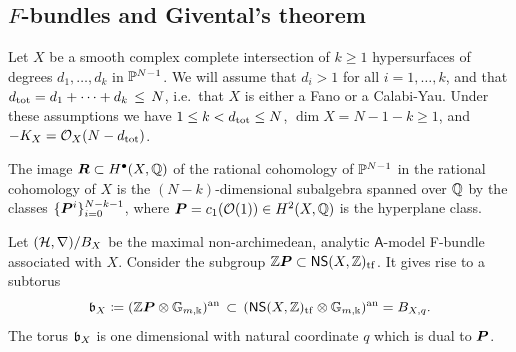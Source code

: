\documentclass[twoside,leqno]{article}
\numberwithin{equation}{section}
\theoremstyle{plain}
\theoremstyle{definition}
\begin{document}
\subsection{\texorpdfstring{$F$}{F}-bundles and Givental's theorem} \label{ssec:givental}
 
Let $X$ be a smooth complex complete intersection of $k \geq 1$ hypersurfaces of degrees $d_{1}, \ldots, d_{k}$ in $\mathbb P^{N-1}$. We will assume that $d_{i} > 1$ for all $i =1, \ldots, k$, and that $d_{\operatorname{tot}} = d_{1} + \cdots + d_{k} \, \leq \, N$, i.e.\ that $X$ is either a Fano or a Calabi-Yau. Under these assumptions we have $1 \leq k < d_{\operatorname{tot}} \leq N$, 
$\dim X = N - 1 - k \geq 1$, and $-K_{X} = \mathcal O_{X}(N - d_{\operatorname{tot}})$. 

The image $\boldsymbol{R} \subset H^{\bullet}(X,\mathbb Q)$ of the rational cohomology of $\mathbb P^{N-1}$ in the rational cohomology of $X$ is the $(N-k)$-dimensional subalgebra spanned over $\mathbb Q$ by the classes $\{\boldsymbol{P}^{i} \}_{i = 0}^{N-k-1}$, where $\boldsymbol{P} = c_{1}(\mathcal O(1)) \in H^2(X,\mathbb Q)$ is the hyperplane class. 


Let $(\mathcal H,\nabla)/B_{X}$ be the maximal non-archimedean, analytic $\mathsf{A}$-model F-bundle associated with  $X$. Consider the subgroup $\mathbb Z\boldsymbol{P} \subset \mathsf{NS}(X,\mathbb Z)_{\operatorname{tf}}$. It gives rise to a subtorus 
\[
\mathfrak{b}_{X} \coloneqq (\mathbb Z\boldsymbol{P} \otimes \mathbb G_{m,\Bbbk})^{\operatorname{an}} \, \subset \, (\mathsf{NS}(X,\mathbb Z)_{\operatorname{tf}}\otimes \mathbb G_{m,\Bbbk})^{\operatorname{an}} = B_{X,q}.
\]
The torus $\mathfrak{b}_{X}$ is one dimensional with natural coordinate $q$ which is dual to $\boldsymbol{P}$.
\end{document}

